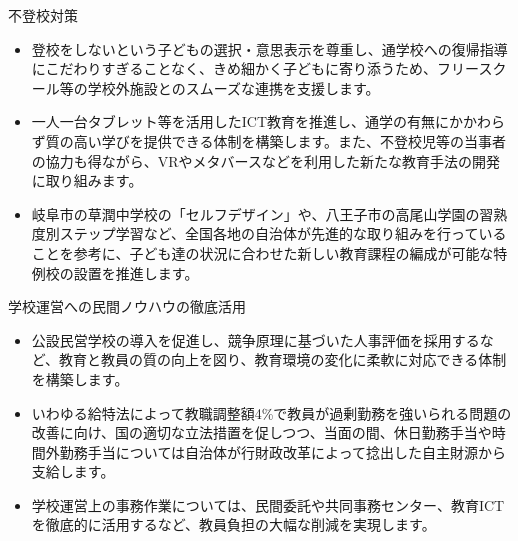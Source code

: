 \documentclass[dvipdfmx]{beamer}
\begin{document}
    \begin{frame}{不登校対策}{}
        \begin{small}
            \begin{itemize}
                \setlength{\itemsep}{2mm}
                \item 登校をしないという子どもの選択・意思表示を尊重し、通学校への復帰指導にこだわりすぎることなく、きめ細かく子どもに寄り添うため、フリースクール等の学校外施設とのスムーズな連携を支援します。
                \item 一人一台タブレット等を活用したICT教育を推進し、通学の有無にかかわらず質の高い学びを提供できる体制を構築します。また、不登校児等の当事者の協力も得ながら、VRやメタバースなどを利用した新たな教育手法の開発に取り組みます。
                \item 岐阜市の草潤中学校の「セルフデザイン」や、八王子市の高尾山学園の習熟度別ステップ学習など、全国各地の自治体が先進的な取り組みを行っていることを参考に、子ども達の状況に合わせた新しい教育課程の編成が可能な特例校の設置を推進します。
            \end{itemize}
        \end{small}
    \end{frame}

    \begin{frame}{学校運営への民間ノウハウの徹底活用}{}
        \begin{small}
            \begin{itemize}
                \setlength{\itemsep}{2mm}
                \item 公設民営学校の導入を促進し、競争原理に基づいた人事評価を採用するなど、教育と教員の質の向上を図り、教育環境の変化に柔軟に対応できる体制を構築します。
                \item いわゆる給特法によって教職調整額4\%で教員が過剰勤務を強いられる問題の改善に向け、国の適切な立法措置を促しつつ、当面の間、休日勤務手当や時間外勤務手当については自治体が行財政改革によって捻出した自主財源から支給します。
                \item 学校運営上の事務作業については、民間委託や共同事務センター、教育ICTを徹底的に活用するなど、教員負担の大幅な削減を実現します。
            \end{itemize}
        \end{small}
    \end{frame}
\end{document}
